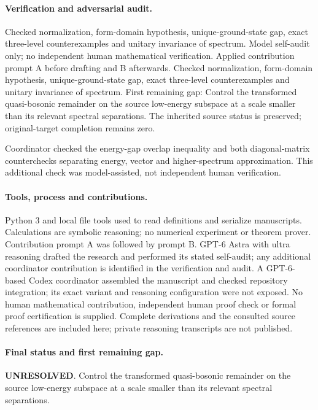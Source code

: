 \documentclass[11pt]{article}
\begin{document}
\paragraph{Verification and adversarial audit.}
Checked normalization, form-domain hypothesis, unique-ground-state gap, exact three-level counterexamples and unitary invariance of spectrum. Model self-audit only; no independent human mathematical verification. Applied contribution prompt A before drafting and B afterwards. Checked normalization, form-domain hypothesis, unique-ground-state gap, exact three-level counterexamples and unitary invariance of spectrum. First remaining gap: Control the transformed quasi-bosonic remainder on the source low-energy subspace at a scale smaller than its relevant spectral separations. The inherited source status is preserved; original-target completion remains zero.

Coordinator checked the energy-gap overlap inequality and both diagonal-matrix counterchecks separating energy, vector and higher-spectrum approximation. This additional check was model-assisted, not independent human verification.

\paragraph{Tools, process and contributions.}
Python 3 and local file tools used to read definitions and serialize manuscripts. Calculations are symbolic reasoning; no numerical experiment or theorem prover. Contribution prompt A was followed by prompt B. GPT-6 Astra with ultra reasoning drafted the research and performed its stated self-audit; any additional coordinator contribution is identified in the verification and audit. A GPT-6-based Codex coordinator assembled the manuscript and checked repository integration; its exact variant and reasoning configuration were not exposed. No human mathematical contribution, independent human proof check or formal proof certification is supplied. Complete derivations and the consulted source references are included here; private reasoning transcripts are not published.

\paragraph{Final status and first remaining gap.}
\textbf{UNRESOLVED}. Control the transformed quasi-bosonic remainder on the source low-energy subspace at a scale smaller than its relevant spectral separations.
\end{document}
